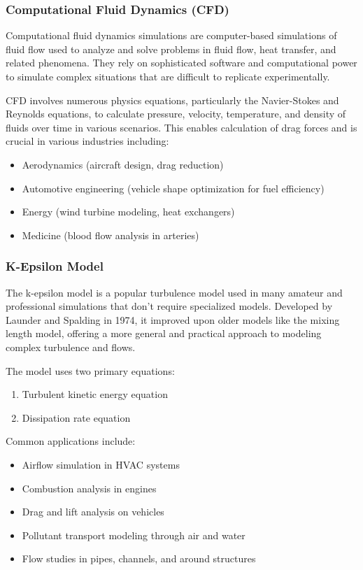 \documentclass[12pt,a4paper]{article}
\begin{document}
\subsubsection{Computational Fluid Dynamics (CFD)}

Computational fluid dynamics simulations are computer-based simulations of fluid flow used to analyze and solve problems in fluid flow, heat transfer, and related phenomena. They rely on sophisticated software and computational power to simulate complex situations that are difficult to replicate experimentally.

CFD involves numerous physics equations, particularly the Navier-Stokes and Reynolds equations, to calculate pressure, velocity, temperature, and density of fluids over time in various scenarios. This enables calculation of drag forces and is crucial in various industries including:
\begin{itemize}
    \item Aerodynamics (aircraft design, drag reduction)
    \item Automotive engineering (vehicle shape optimization for fuel efficiency)
    \item Energy (wind turbine modeling, heat exchangers)
    \item Medicine (blood flow analysis in arteries)
\end{itemize}

\subsubsection{K-Epsilon Model}

The k-epsilon model is a popular turbulence model used in many amateur and professional simulations that don't require specialized models. Developed by Launder and Spalding in 1974, it improved upon older models like the mixing length model, offering a more general and practical approach to modeling complex turbulence and flows.

The model uses two primary equations:
\begin{enumerate}
    \item Turbulent kinetic energy equation
    \item Dissipation rate equation
\end{enumerate}

Common applications include:
\begin{itemize}
    \item Airflow simulation in HVAC systems
    \item Combustion analysis in engines
    \item Drag and lift analysis on vehicles
    \item Pollutant transport modeling through air and water
    \item Flow studies in pipes, channels, and around structures
\end{itemize}
\end{document}
